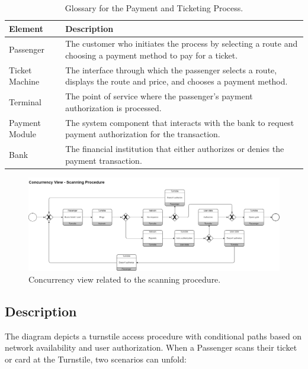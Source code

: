 \begin{table}[H]
    \centering
    \caption{Glossary for the Payment and Ticketing Process.}
    \label{tab:payment_ticketing_glossary}
    \begin{tabularx}{\textwidth}{@{}lX@{}} %
    \toprule
    \textbf{Element} & \textbf{Description} \\
    \midrule
    Passenger & The customer who initiates the process by selecting a route and choosing a payment method to pay for a ticket. \\
    Ticket Machine & The interface through which the passenger selects a route, displays the route and price, and chooses a payment method. \\
    Terminal & The point of service where the passenger's payment authorization is processed. \\
    Payment Module & The system component that interacts with the bank to request payment authorization for the transaction. \\
    Bank & The financial institution that either authorizes or denies the payment transaction. \\
    \bottomrule
    \end{tabularx}
\end{table}

\begin{figure}[H]
    \centering
    \includegraphics[width=\textwidth]{drawings/views_final_version/concurrency_view_2.png}
    \caption{Concurrency view related to the scanning procedure.}
    \label{fig:concurrency_view_2}
\end{figure}

\subsection*{Description}
The diagram depicts a turnstile access procedure with conditional paths based on network availability and user authorization. When a Passenger scans their ticket or card at the Turnstile, two scenarios can unfold:


